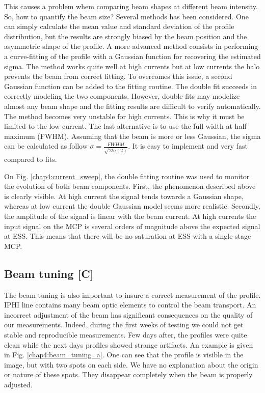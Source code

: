 \begin{refsection}
  This causes a problem whem comparing beam shapes at different beam intensity. So, how to quantify the beam size? Several methods has been considered. One can simply calculate the mean value and standard deviation of the profile distribution, but the results are strongly biased by the beam position and the asymmetric shape of the profile. A more advanced method consists in performing a curve-fitting of the profile with a Gaussian function for recovering the estimated sigma. The method works quite well at high currents but at low currents the halo prevents the beam from correct fitting. To overcomes this issue, a second Gaussian function can be added to the fitting routine. The double fit succeeds in correctly modeling the two components. However, double fits may modelize almost any beam shape and the fitting results are difficult to verify automatically. The method becomes very unstable for high currents. This is why it must be limited to the low current. The last alternative is to use the full width at half maximum (FWHM). Assuming that the beam is more or less Gaussian, the sigma can be calculated as follow $\sigma = \frac{FWHM}{\sqrt{2ln(2)}}$. It is easy to implement and very fast compared to fits.

  

  On Fig. \ref{chap4:current_sweep}, the double fitting routine was used to monitor the evolution of both beam components. First, the phenomenon described above is clearly visible. At high current the signal tends towards a Gaussian shape, whereas at low current the double Gaussian model seems more realistic. Secondly, the amplitude of the signal is linear with the beam current. At high currents the input signal on the MCP is several orders of magnitude above the expected signal at ESS. This means that there will be no saturation at ESS with a single-stage MCP.

  \subsection{Beam tuning [C]}
  The beam tuning is also important to insure a correct measurement of the profile. IPHI line contains many beam optic elements to control the beam transport. An incorrect adjustment of the beam has significant consequences on the quality of our measurements. Indeed, during the first weeks of testing we could not get stable and reproducible measurements. Few days after, the profiles were quite clean while the next days profiles showed strange artifacts. An example is given in Fig. \ref{chap4:beam_tuning_a}. One can see that the profile is visible in the image, but with two spots on each side. We have no explanation about the origin or nature of these spots. They disappear completely when the beam is properly adjusted.


\end{refsection}
